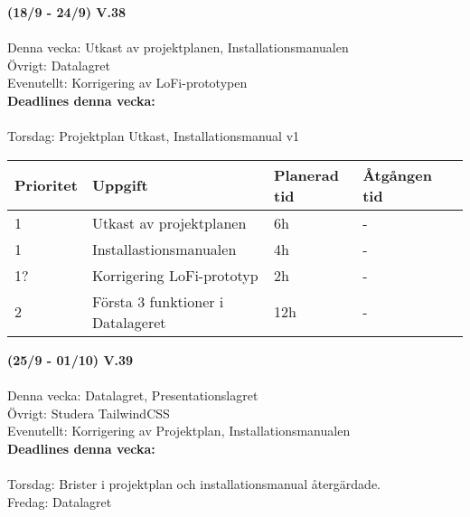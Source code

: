 \documentclass{TDP003mall}
\begin{document}
  \hrulefill
  \vspace{6em}

\textbf{(18/9 - 24/9) V.38}\\\\
  Denna vecka: Utkast av projektplanen, Installationsmanualen\\
  Övrigt: Datalagret\\
  Evenutellt: Korrigering av LoFi-prototypen\\

  \textbf{Deadlines denna vecka: }\\\\
  Torsdag: Projektplan Utkast, Installationsmanual v1


\begin{table}[]
  \begin{tabular}{|l|l|l|l|l|}
  \hline
   Prioritet & Uppgift                    & Planerad tid & Åtgången tid \\ \hline
   1         & Utkast av projektplanen  & 6h          & -          \\ \hline
   1         & Installastionsmanualen  & 4h           & -       \\ \hline
   1?        & Korrigering LoFi-prototyp &2h          & -       \\ \hline
   2         & Första 3 funktioner i Datalageret & 12h           & -           \\ \hline
  \end{tabular}
  \end{table}

  \hrulefill

  \textbf{(25/9 - 01/10) V.39}\\\\
  Denna vecka: Datalagret, Presentationslagret\\
  Övrigt: Studera TailwindCSS\\
  Evenutellt: Korrigering av Projektplan, Installationsmanualen\\

  \textbf{Deadlines denna vecka: }\\\\
  Torsdag: Brister i projektplan och installationsmanual återgärdade.\\
  Fredag: Datalagret
\end{document}

